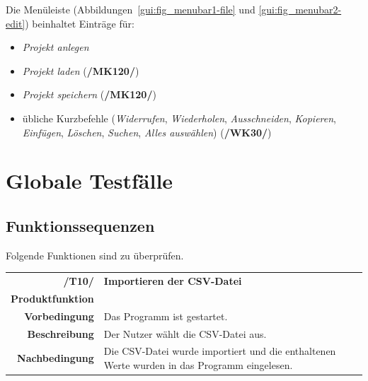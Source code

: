 \documentclass{article}
\begin{document}
Die Menüleiste (Abbildungen~\ref{gui:fig_menubar1-file} und \ref{gui:fig_menubar2-edit}) beinhaltet Einträge für:
\begin{itemize}
    \item \emph{Projekt anlegen}
    \item \emph{Projekt laden} (\textbf{/MK120/})
    \item \emph{Projekt speichern} (\textbf{/MK120/})
    \item übliche Kurzbefehle (\emph{Widerrufen}, \emph{Wiederholen}, \emph{Ausschneiden}, \emph{Kopieren}, \emph{Einfügen}, \emph{Löschen}, \emph{Suchen}, \emph{Alles auswählen}) (\textbf{/WK30/})
\end{itemize}

\clearpage
\section{Globale Testfälle}

\subsection{Funktionssequenzen}
Folgende Funktionen sind zu überprüfen.

\begin{table}[H]
\begin{tabularx}{\textwidth}{rX}
\vspace{1mm}
\textbf{/T10/}         & \textbf{Importieren der CSV-Datei} \\ \vspace{1mm}
\textbf{Produktfunktion} & \nameref{sec:f:Projekt laden}\\ \vspace{1mm}
\textbf{Vorbedingung}  & Das Programm ist gestartet. \\ \vspace{1mm}
\textbf{Beschreibung}  & Der Nutzer wählt die CSV-Datei aus. \\
\textbf{Nachbedingung} & Die CSV-Datei wurde importiert und die enthaltenen Werte wurden in das Programm eingelesen.
\end{tabularx}
\end{table}
\end{document}
